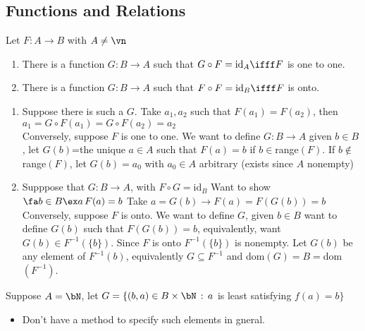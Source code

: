 
\subsection{Functions and Relations} 

\begin{theorem}
    Let $F: A \to B$ with $A \neq \vn$ 
    \begin{enumerate}[label = (\alph*)]
        \item There is a function $G: B \to A$ such that $G \circ F = \text{id}_A \ifff F$ is one to one. 
        \item There is a function $G: B \to A$ such that $F \circ F = \text{id}_B \ifff F$ is onto. 
    \end{enumerate}
\end{theorem}

\begin{pf}
    \begin{enumerate}[label = (\alph*)]
        \item Suppose there is such a $G$. Take $a_1, a_2$ such that $F(a_1)=F(a_2)$, then $a_1 = G\circ F (a_1) = G \circ F (a_2)=a_2$ \\
        Conversely, suppose $F$ is one to one. We want to define $G: B \to A$ given $b \in B$, let $G(b)$=the unique $a \in A$ such that $F(a)=b$ if $b \in $range$(F)$. If $b \not \in$ range$(F)$, let $G(b)=a_0$ with $a_0 \in A$ arbitrary (exists since $A$ nonempty)
        \item Supppose that $G: B \to A$, with $F \circ G = \text{id}_B$ Want to show $\fa b \in B \ex a \, F(a)=b$ Take $a = G(b) \to F(a) = F(G(b))=b$ \\
        Conversely, suppose $F$ is onto. We want to define $G$, given $b \in B$ want to define $G(b)$ such that $F(G(b))=b$, equivalently, want $G(b) \in F^{-1}(\{b\})$. Since $F$ is onto $F^{-1}(\{b\})$ is nonempty. Let $G(b)$ be any element of $F^{-1}(b)$, equivalently $G \subseteq F^{-1}$ and dom$(G)=B=$dom$(F^{-1})$. 
    \end{enumerate}
\end{pf}

\begin{example}
    Suppose $A = \bN$, let $G = \{(b, a) \in B \times \bN \, : \, a$ is least satisfying $f(a)=b\}$
\end{example}

\begin{itemize}
    \item Don't have a method to specify such elements in gneral. 
\end{itemize}


